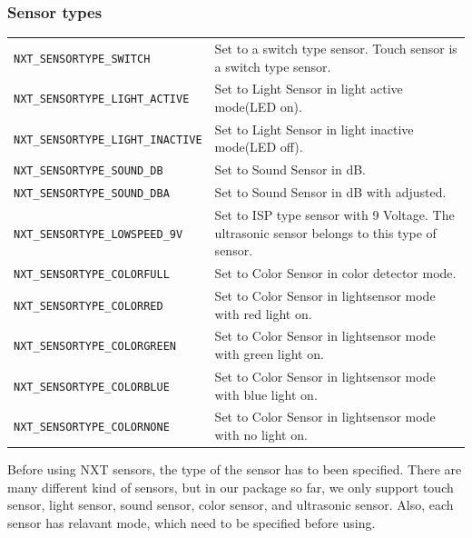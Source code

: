 \documentclass[11pt]{article}
\begin{document}
\subsubsection*{Sensor types}
\begin{longtable}{p{5.5cm}p{10cm}}
    \hline
    {\tt NXT\_SENSORTYPE\_SWITCH}       &Set to a switch type sensor. Touch 
    sensor is a switch type sensor.\\
    {\tt NXT\_SENSORTYPE\_LIGHT\_ACTIVE}&Set to Light Sensor in light active 
    mode(LED on).\\
    {\tt NXT\_SENSORTYPE\_LIGHT\_INACTIVE}&Set to Light Sensor in light inactive 
    mode(LED off).\\
    {\tt NXT\_SENSORTYPE\_SOUND\_DB}    &Set to Sound Sensor in dB.\\
    {\tt NXT\_SENSORTYPE\_SOUND\_DBA}   &Set to Sound Sensor in dB with adjusted.\\
    {\tt NXT\_SENSORTYPE\_LOWSPEED\_9V} &Set to ISP type sensor with 9 Voltage. 
    The ultrasonic sensor belongs to this type of sensor.\\
    {\tt NXT\_SENSORTYPE\_COLORFULL}    &Set to Color Sensor in color detector 
    mode.\\
    {\tt NXT\_SENSORTYPE\_COLORRED}     &Set to Color Sensor in lightsensor 
    mode with red light on.\\
    {\tt NXT\_SENSORTYPE\_COLORGREEN}   &Set to Color Sensor in lightsensor 
    mode with green light on.\\
    {\tt NXT\_SENSORTYPE\_COLORBLUE}    &Set to Color Sensor in lightsensor 
    mode with blue light on.\\
    {\tt NXT\_SENSORTYPE\_COLORNONE}    &Set to Color Sensor in lightsensor 
    mode with no light on.\\
    \hline
\end{longtable}
Before using NXT sensors, the type of the sensor has to been specified. There
are many different kind of sensors, but in our package so far, we only support 
touch sensor, light sensor, sound sensor, color sensor, and ultrasonic sensor. 
Also, each sensor has relavant mode, which need to be specified before using.
\end{document}
